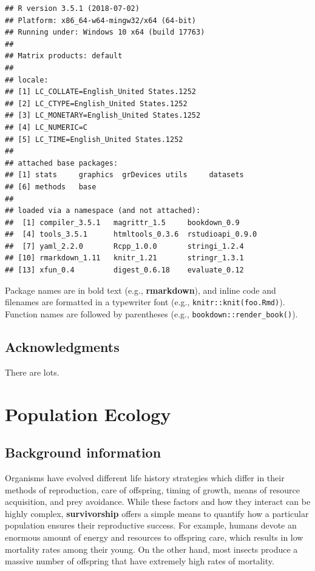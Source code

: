 \documentclass[]{book}
\begin{document}
\begin{verbatim}
## R version 3.5.1 (2018-07-02)
## Platform: x86_64-w64-mingw32/x64 (64-bit)
## Running under: Windows 10 x64 (build 17763)
## 
## Matrix products: default
## 
## locale:
## [1] LC_COLLATE=English_United States.1252 
## [2] LC_CTYPE=English_United States.1252   
## [3] LC_MONETARY=English_United States.1252
## [4] LC_NUMERIC=C                          
## [5] LC_TIME=English_United States.1252    
## 
## attached base packages:
## [1] stats     graphics  grDevices utils     datasets 
## [6] methods   base     
## 
## loaded via a namespace (and not attached):
##  [1] compiler_3.5.1   magrittr_1.5     bookdown_0.9    
##  [4] tools_3.5.1      htmltools_0.3.6  rstudioapi_0.9.0
##  [7] yaml_2.2.0       Rcpp_1.0.0       stringi_1.2.4   
## [10] rmarkdown_1.11   knitr_1.21       stringr_1.3.1   
## [13] xfun_0.4         digest_0.6.18    evaluate_0.12
\end{verbatim}

Package names are in bold text (e.g., \textbf{rmarkdown}), and inline code and filenames are formatted in a typewriter font (e.g., \texttt{knitr::knit(\textquotesingle{}foo.Rmd\textquotesingle{})}). Function names are followed by parentheses (e.g., \texttt{bookdown::render\_book()}).

\hypertarget{acknowledgments}{%
\section*{Acknowledgments}\label{acknowledgments}}


There are lots.

\mainmatter

\hypertarget{population}{%
\chapter{Population Ecology}\label{population}}

\hypertarget{background-information}{%
\section{Background information}\label{background-information}}

Organisms have evolved different life history strategies which differ in their methods of reproduction, care of offspring, timing of growth, means of resource acquisition, and prey avoidance. While these factors and how they interact can be highly complex, \textbf{survivorship} offers a simple means to quantify how a particular population ensures their reproductive success. For example, humans devote an enormous amount of energy and resources to offspring care, which results in low mortality rates among their young. On the other hand, most insects produce a massive number of offspring that have extremely high rates of mortality.
\end{document}
